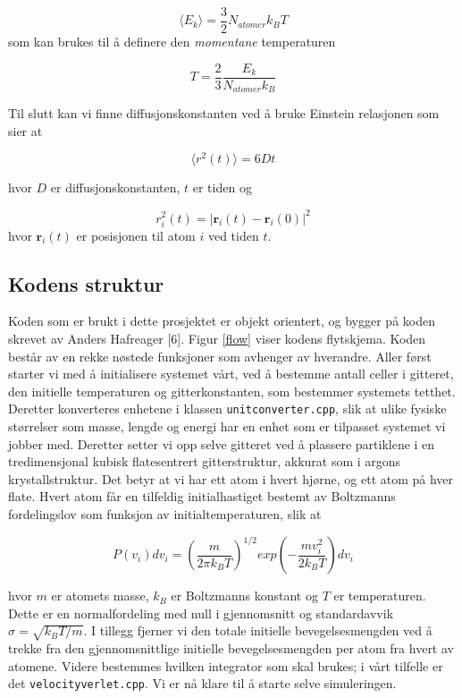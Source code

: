 \documentclass[paper=a4, fontsize=11pt]{scrartcl} %
\numberwithin{equation}{section} %
\numberwithin{figure}{section} %
\numberwithin{table}{section} %
\begin{document}
\begin{equation}
\langle E_k \rangle = \frac{3}{2}N_{atomer} k_B T
\end{equation}
som kan brukes til å definere den \textit{momentane} temperaturen

\begin{equation}
T = \frac{2}{3}\frac{E_k}{N_{atomer} k_B}
\end{equation}

Til slutt kan vi finne diffusjonskonstanten ved å bruke Einstein relasjonen som sier at

\begin{equation}
\langle r^2(t) \rangle = 6 D t
\end{equation}

hvor $D$ er diffusjonskonstanten, $t$ er tiden og

\begin{equation}
r_i^2 (t) = | \textbf{r}_i (t) - \textbf{r}_i (0) |^2
\end{equation} 
hvor $\textbf{r}_i (t)$ er posisjonen til atom $i$ ved tiden $t$.

\subsection{Kodens struktur}
Koden som er brukt i dette prosjektet er objekt orientert, og bygger på koden skrevet av Anders Hafreager [6]. Figur \ref{flow} viser kodens flytskjema. Koden består av en rekke nøstede funksjoner som avhenger av hverandre. Aller først starter vi med å initialisere systemet vårt, ved å bestemme antall celler i gitteret, den initielle temperaturen og gitterkonstanten, som bestemmer systemets tetthet. Deretter konverteres enhetene i klassen \texttt{unitconverter.cpp}, slik at ulike fysiske størrelser som masse, lengde og energi har en enhet som er tilpasset systemet vi jobber med. Deretter setter vi opp selve gitteret ved å plassere partiklene i en tredimensjonal kubisk flatesentrert gitterstruktur, akkurat som i argons krystallstruktur. Det betyr at vi har ett atom i hvert hjørne, og ett atom på hver flate. Hvert atom får en tilfeldig initialhastiget bestemt av Boltzmanns fordelingslov som funksjon av initialtemperaturen, slik at 

\begin{equation}
P(v_i)dv_i = \left(\frac{m}{2\pi k_B T} \right)^{1/2} exp \left(- \frac{mv_i^2}{2k_B T} \right)dv_i
\end{equation}

hvor $m$ er atomets masse, $k_B$ er Boltzmanns konstant og $T$ er temperaturen. Dette er en normalfordeling med null i gjennomsnitt og standardavvik $\sigma = \sqrt{k_B T/m}$. I tillegg fjerner vi den totale initielle bevegelsesmengden ved å trekke fra den gjennomsnittlige initielle bevegelsesmengden per atom fra hvert av atomene. Videre bestemmes hvilken integrator som skal brukes; i vårt tilfelle er det \texttt{velocityverlet.cpp}. Vi er nå klare til å starte selve simuleringen. \\
\end{document}

